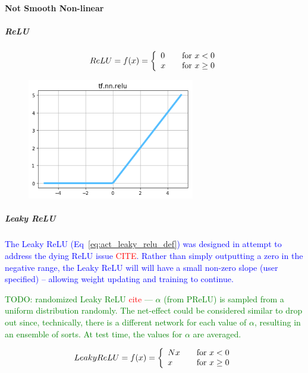\paragraph{Not Smooth Non-linear}

\subparagraph{ReLU}

\begin{equation}
{
	ReLU = f(x) = \left\{
	\begin{array}{ll}
	0 & \quad $for$ \ x < 0 \\
	x & \quad $for$ \ x \ge 0
	\end{array}
	\right.
}
\label{eq:act_relu_def}
\end{equation}

\begin{figure}
	\centering
	\includegraphics[width=0.65\textwidth]{./sync_imgs/act/notsmooth/relu.png}
	\label{fig:act_notsmooth_relu}
\end{figure}

\subparagraph{Leaky ReLU}

\textcolor{blue}{The Leaky ReLU (Eq~\ref{eq:act_leaky_relu_def}) was designed in attempt to address the dying ReLU issue \textcolor{red}{CITE}. Rather than simply outputting a zero in the negative range, the Leaky ReLU will will have a small non-zero slope (user specified) -- allowing weight updating and training to continue.}

\textcolor{green}{TODO: randomized Leaky ReLU \textcolor{red}{cite} --- $\alpha$ (from PReLU) is sampled from a uniform distribution randomly. The net-effect could be considered similar to drop out since, technically, there is a different network for each value of $\alpha$, resulting in an ensemble of sorts. At test time, the values for $\alpha$ are averaged.}

\begin{equ}[!ht]
	\begin{equation}
	{
		Leaky ReLU = f(x) = \left\{
		\begin{array}{ll}
		N x & \quad $for$ \ x < 0 \\
		x & \quad $for$ \ x \ge 0
		\end{array}
		\right.
	}
	\label{eq:act_leaky_relu_def}
	\end{equation}
	\caption{where $N$ is a constant. $N$ is typically set to 0.01}
\end{equ}

